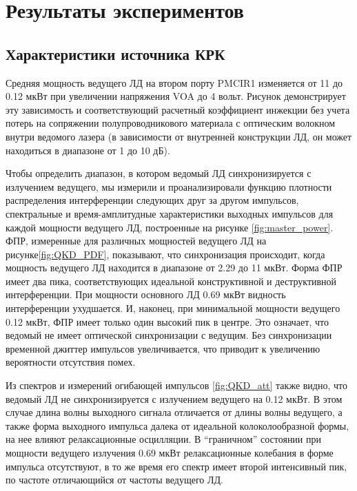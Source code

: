 \section{Результаты экспериментов}
\label{sec:results}

\subsection{Характеристики источника КРК}


Средняя мощность ведущего ЛД на втором порту PMCIR1 изменяется от 11 до 0.12 мкВт при увеличении напряжения VOA до 4 вольт. Рисунок  демонстрирует эту зависимость и соответствующий расчетный коэффициент инжекции без учета потерь на сопряжении полупроводникового материала с оптическим волокном внутри ведомого лазера (в зависимости от внутренней конструкции ЛД, он может находиться в диапазоне от 1 до 10 дБ). 

Чтобы определить диапазон, в котором ведомый ЛД синхронизируется с излучением ведущего, мы измерили и проанализировали функцию плотности распределения интерференции следующих друг за другом импульсов, спектральные и время-амплитудные характеристики выходных импульсов для каждой мощности ведущего ЛД, построенные на рисунке \cref{fig:master_power}. ФПР, измеренные для различных мощностей ведущего ЛД на рисунке\cref{fig:QKD_PDF}, показывают, что синхронизация происходит, когда мощность ведущего ЛД находится в диапазоне от 2.29 до 11 мкВт.  Форма ФПР имеет два пика, соответствующих идеальной конструктивной и деструктивной интерференции. При мощности основного ЛД 0.69 мкВт видность интерференции ухудшается. И, наконец, при минимальной мощности ведущего 0.12 мкВт, ФПР имеет только один высокий пик в центре. Это означает, что ведомый не имеет оптической синхронизации с ведущим. Без синхронизации временной джиттер импульсов увеличивается, что приводит к увеличению вероятности отсутствия помех.

Из спектров  и измерений огибающей импульсов \cref{fig:QKD_att} также видно, что ведомый ЛД не синхронизируется с излучением ведущего на 0.12 мкВт. В этом случае длина волны выходного сигнала отличается от длины волны ведущего, а также форма выходного импульса далека от идеальной колоколообразной формы, на нее влияют релаксационные осцилляции. В ``граничном'' состоянии при мощности ведущего излучения 0.69 мкВт релаксационные колебания в форме импульса отсутствуют, в то же время его спектр имеет второй интенсивный пик, по частоте отличающийся от частоты ведущего ЛД.

